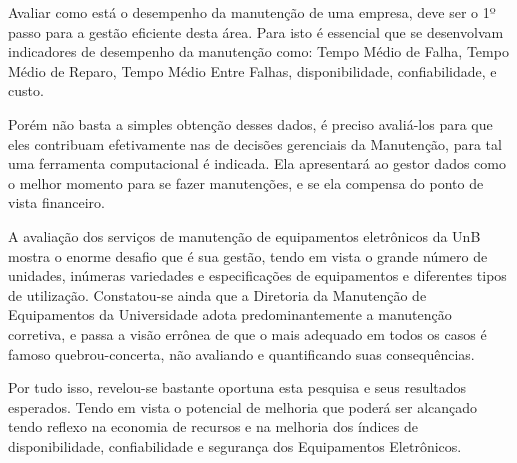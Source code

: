 Avaliar como está o desempenho da manutenção de uma empresa, deve ser o 1º passo para a gestão eficiente desta área. Para isto é essencial que se desenvolvam indicadores de desempenho da manutenção como: Tempo Médio de Falha, Tempo Médio de Reparo, Tempo Médio Entre Falhas, disponibilidade, confiabilidade, e custo.

Porém não basta a simples obtenção desses dados, é preciso avaliá-los para que eles contribuam efetivamente nas de decisões gerenciais da Manutenção, para tal uma ferramenta computacional é indicada. Ela apresentará ao gestor dados como o melhor momento para se fazer manutenções, e se ela compensa do ponto de vista financeiro.

A avaliação dos serviços de manutenção de equipamentos eletrônicos da UnB mostra o enorme desafio que é sua gestão, tendo em vista o grande número de unidades, inúmeras variedades e especificações de equipamentos e diferentes tipos de utilização. Constatou-se ainda que a Diretoria da Manutenção de Equipamentos da Universidade adota predominantemente a manutenção corretiva, e passa a visão errônea de que o mais adequado em todos os casos é famoso quebrou-concerta, não avaliando e quantificando suas consequências.

Por tudo isso, revelou-se bastante oportuna esta pesquisa e seus resultados esperados. Tendo em vista o potencial de melhoria que poderá ser alcançado tendo reflexo na economia de recursos e na melhoria dos índices de disponibilidade, confiabilidade e segurança dos Equipamentos Eletrônicos.
